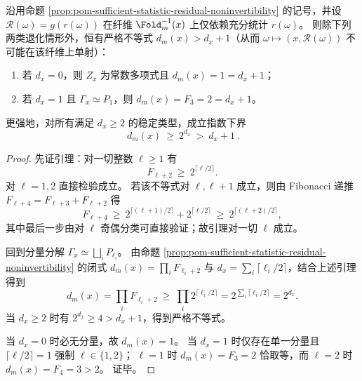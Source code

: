 \begin{corollary}[充分统计外置与可逆外置不相容的完全退化分类]\label{cor:pom-sufficient-statistic-injective-degeneracy-classification}
沿用命题 \ref{prop:pom-sufficient-statistic-residual-noninvertibility} 的记号，并设 \(\mathcal R(\omega)=g(r(\omega))\) 在纤维 \(\Fold_m^{-1}(x)\) 上仅依赖充分统计 \(r(\omega)\)。
则除下列两类退化情形外，恒有严格不等式 \(d_m(x)>d_x+1\)（从而 \(\omega\mapsto(x,\mathcal R(\omega))\) 不可能在该纤维上单射）：
\begin{enumerate}
  \item \textup{若 \(d_x=0\)，则 \(Z_x\) 为常数多项式且 \(d_m(x)=1=d_x+1\)；}
  \item \textup{若 \(d_x=1\) 且 \(\Gamma_x\simeq P_1\)，则 \(d_m(x)=F_3=2=d_x+1\)。}
\end{enumerate}
更强地，对所有满足 \(d_x\ge 2\) 的稳定类型，成立指数下界
\[
\boxed{\ d_m(x)\ \ge\ 2^{d_x}\ >\ d_x+1\ }.
\]
\end{corollary}
\begin{proof}
先证引理：对一切整数 \(\ell\ge 1\) 有
\[
F_{\ell+2}\ \ge\ 2^{\lceil \ell/2\rceil}.
\]
对 \(\ell=1,2\) 直接检验成立。
若该不等式对 \(\ell,\ell+1\) 成立，则由 Fibonacci 递推 \(F_{\ell+4}=F_{\ell+3}+F_{\ell+2}\) 得
\[
F_{\ell+4}\ \ge\ 2^{\lceil (\ell+1)/2\rceil}+2^{\lceil \ell/2\rceil}
\ \ge\ 2^{\lceil (\ell+2)/2\rceil},
\]
其中最后一步由对 \(\ell\) 奇偶分类可直接验证；故引理对一切 \(\ell\) 成立。
\par
回到分量分解 \(\Gamma_x\simeq\bigsqcup_i P_{\ell_i}\)。
由命题 \ref{prop:pom-sufficient-statistic-residual-noninvertibility} 的闭式
\(
d_m(x)=\prod_i F_{\ell_i+2}
\) 与
\(
d_x=\sum_i\lceil \ell_i/2\rceil
\)，结合上述引理得到
\[
d_m(x)
=\prod_i F_{\ell_i+2}
\ \ge\ \prod_i 2^{\lceil \ell_i/2\rceil}
=2^{\sum_i\lceil \ell_i/2\rceil}
=2^{d_x}.
\]
当 \(d_x\ge 2\) 时有 \(2^{d_x}\ge 4>d_x+1\)，得到严格不等式。
\par
当 \(d_x=0\) 时必无分量，故 \(d_m(x)=1\)。
当 \(d_x=1\) 时仅存在单一分量且 \(\lceil \ell/2\rceil=1\) 强制 \(\ell\in\{1,2\}\)；
\(\ell=1\) 时 \(d_m(x)=F_3=2\) 恰取等，而 \(\ell=2\) 时 \(d_m(x)=F_4=3>2\)。
证毕。
\end{proof}

